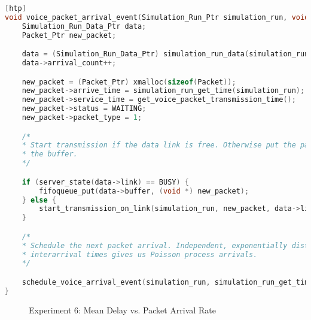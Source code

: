\begin{lstlisting}[language=C, caption={Modifications to Experiment 6 Code}, label={list:exp6}][htp]
void voice_packet_arrival_event(Simulation_Run_Ptr simulation_run, void *ptr) {
	Simulation_Run_Data_Ptr data;
	Packet_Ptr new_packet;

	data = (Simulation_Run_Data_Ptr) simulation_run_data(simulation_run);
	data->arrival_count++;

	new_packet = (Packet_Ptr) xmalloc(sizeof(Packet));
	new_packet->arrive_time = simulation_run_get_time(simulation_run);
	new_packet->service_time = get_voice_packet_transmission_time();
	new_packet->status = WAITING;
	new_packet->packet_type = 1;

	/*
	* Start transmission if the data link is free. Otherwise put the packet into
	* the buffer.
	*/

	if (server_state(data->link) == BUSY) {
		fifoqueue_put(data->buffer, (void *) new_packet);
	} else {
		start_transmission_on_link(simulation_run, new_packet, data->link);
	}

	/*
	* Schedule the next packet arrival. Independent, exponentially distributed
	* interarrival times gives us Poisson process arrivals.
	*/

	schedule_voice_arrival_event(simulation_run, simulation_run_get_time(simulation_run) + 0.2);
}
\end{lstlisting}

\begin{figure}[htp]
\centering
{}
\caption{Experiment 6: Mean Delay vs. Packet Arrival Rate}
\label{fig:exp6}
\end{figure}
